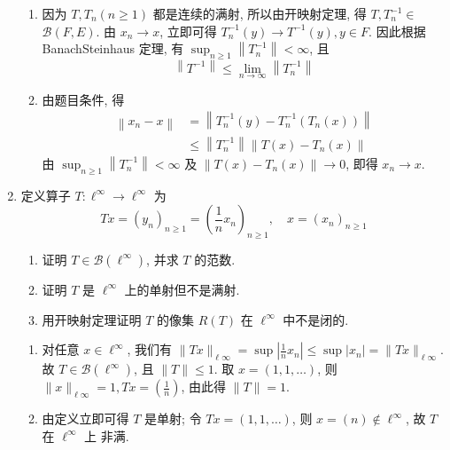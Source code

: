 \begin{enumerate}
\begin{answer}
\begin{enumerate}
            \item 因为 $T, T_{n}(n \geq 1)$ 都是连续的满射, 所以由开映射定理, 得 $T, T_{n}^{-1} \in$ $\mathcal{B}(F, E)$. 由 $x_{n} \rightarrow x$, 立即可得 $T_{n}^{-1}(y) \rightarrow T^{-1}(y), y \in F$. 因此根据 BanachSteinhaus 定理, 有 $\sup _{n \geq 1}\left\|T_{n}^{-1}\right\|<\infty$, 且
            \[
                \left\|T^{-1}\right\| \leq \lim _{n \rightarrow \infty}\left\|T_{n}^{-1}\right\|
            \]
            \item 由题目条件, 得
            \[
            \begin{aligned}
            \left\|x_{n}-x\right\| &=\left\|T_{n}^{-1}(y)-T_{n}^{-1}\left(T_{n}(x)\right)\right\| \\
            & \leq\left\|T_{n}^{-1}\right\|\left\|T(x)-T_{n}(x)\right\|
            \end{aligned}
            \]
            由 $\sup _{n \geq 1}\left\|T_{n}^{-1}\right\|<\infty$ 及 $\left\|T(x)-T_{n}(x)\right\| \rightarrow 0$, 即得 $x_{n} \longrightarrow x$.
        \end{enumerate}
    \end{answer}
    \item 定义算子 $T: \ell^{\infty} \rightarrow \ell^{\infty}$ 为
    \[
    T x=\left(y_{n}\right)_{n \geq 1}=\left(\frac{1}{n} x_{n}\right)_{n \geq 1}, \quad x=\left(x_{n}\right)_{n \geq 1}
    \]
        \begin{enumerate}
            \item 证明 $T \in \mathcal{B}\left(\ell^{\infty}\right)$, 并求 $T$ 的范数.
            \item 证明 $T$ 是 $\ell^{\infty}$ 上的单射但不是满射.
            \item 用开映射定理证明 $T$ 的像集 $R(T)$ 在 $\ell^{\infty}$ 中不是闭的.
        \end{enumerate}
    \begin{answer}
        \begin{enumerate}
            \item 对任意 $x \in \ell^{\infty}$, 我们有
            $\|T x\|_{\ell \infty}=\sup \left|\frac{1}{n} x_{n}\right| \leq \sup \left|x_{n}\right|=\|T x\|_{\ell \infty} .$
            故 $T \in \mathcal{B}\left(\ell^{\infty}\right)$, 且 $\|T\| \leq 1$. 取 $x=(1,1, \ldots)$, 则 $\|x\|_{\ell \infty}=1, T x=\left(\frac{1}{n}\right)$, 由此得 $\|T\|=1$.
            \item 由定义立即可得 $T$ 是单射; 令 $T x=(1,1, \ldots)$, 则 $x=(n) \notin \ell^{\infty}$, 故 $T$ 在 $\ell^{\infty}$ 上 非满.

\end{enumerate}
\end{answer}
\end{enumerate}
